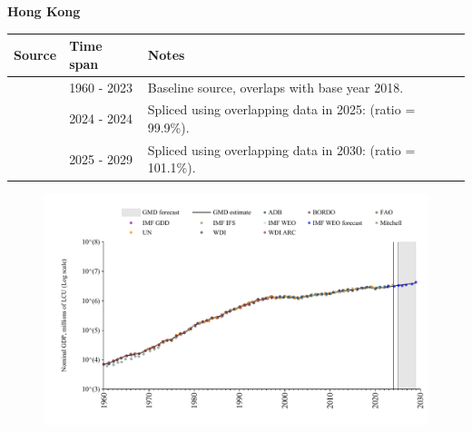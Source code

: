 \documentclass[12pt,a4paper,landscape]{article}
\begin{document}
\begin{adjustbox}{max totalsize={\paperwidth}{\paperheight},center}
\begin{minipage}[t][\textheight][t]{\textwidth}
\vspace*{0.5cm}
{}
\begin{center}
{\Large\bfseries Hong Kong}
\end{center}
\vspace{0.5cm}
\begin{table}[H]
\centering
\small
\begin{tabular}{|l|l|l|}
\hline
\textbf{Source} & \textbf{Time span} & \textbf{Notes} \\
\hline
\rowcolor{white}\cite{WDI}& 1960 - 2023 &Baseline source, overlaps with base year 2018.\\
\rowcolor{lightgray}\cite{IMF_IFS}& 2024 - 2024 &Spliced using overlapping data in 2025: (ratio = 99.9\%).\\
\rowcolor{white}\cite{IMF_WEO_forecast}& 2025 - 2029 &Spliced using overlapping data in 2030: (ratio = 101.1\%).\\
\hline
\end{tabular}
\end{table}
\begin{figure}[H]
\centering
\includegraphics[width=\textwidth,height=0.6\textheight,keepaspectratio]{graphs/HKG_nGDP.pdf}
\end{figure}
\end{minipage}
\end{adjustbox}
\end{document}
